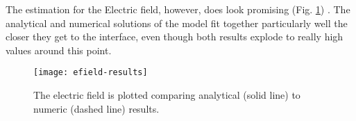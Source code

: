 The estimation for the Electric field, however, does look promising (Fig.  \ref{fig:numerical-phi}) . The analytical and numerical solutions of the model fit together particularly well the closer they get to the interface, even though both results explode  to really high values around this point.
\begin{figure}[h!]
 \centering
\texttt{[image: efield-results]}
 \caption{The electric field is plotted comparing analytical (solid line) to numeric (dashed line) results.}
 \label{fig:numerical-phi}
\end{figure}




